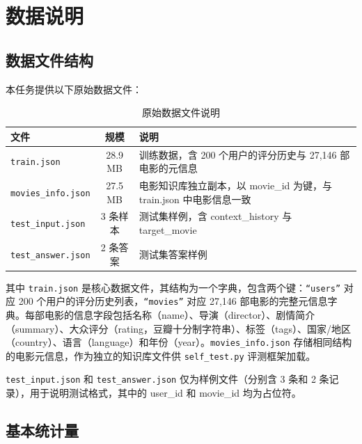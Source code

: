 \documentclass[UTF8,a4paper,10pt]{ctexart}
\begin{document}
\section{数据说明}

\subsection{数据文件结构}

本任务提供以下原始数据文件：

\begin{table}[htbp]
    \centering
    \setlength{\tabcolsep}{14pt}
    \caption{原始数据文件说明}
    \label{tab:files}
    \begin{tabular}{@{}lcp{}@{}}
        \toprule
        \textbf{文件} & \textbf{规模} & \textbf{说明} \\
        \midrule
        \texttt{train.json} & 28.9 MB & 训练数据，含 200 个用户的评分历史与 27,146 部电影的元信息 \\
        \texttt{movies\_info.json} & 27.5 MB & 电影知识库独立副本，以 movie\_id 为键，与 train.json 中电影信息一致 \\
        \texttt{test\_input.json} & 3 条样本 & 测试集样例，含 context\_history 与 target\_movie \\
        \texttt{test\_answer.json} & 2 条答案 & 测试集答案样例 \\
        \bottomrule
    \end{tabular}
\end{table}

其中 \texttt{train.json} 是核心数据文件，其结构为一个字典，包含两个键：\texttt{“users”} 对应 200 个用户的评分历史列表，\texttt{“movies”} 对应 27,146 部电影的完整元信息字典。每部电影的信息字段包括名称（name）、导演（director）、剧情简介（summary）、大众评分（rating，豆瓣十分制字符串）、标签（tags）、国家/地区（country）、语言（language）和年份（year）。\texttt{movies\_info.json} 存储相同结构的电影元信息，作为独立的知识库文件供 \texttt{self\_test.py} 评测框架加载。

\texttt{test\_input.json} 和 \texttt{test\_answer.json} 仅为样例文件（分别含 3 条和 2 条记录），用于说明测试格式，其中的 user\_id 和 movie\_id 均为占位符。

\subsection{基本统计量}
\end{document}
